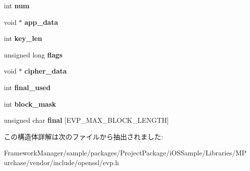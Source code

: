 \begin{DoxyCompactItemize}
\item 
\hypertarget{structevp__cipher__ctx__st_ae09b6c40179528583d8d7b3cc623bd87}{}int {\bfseries num}\label{structevp__cipher__ctx__st_ae09b6c40179528583d8d7b3cc623bd87}

\item 
\hypertarget{structevp__cipher__ctx__st_a00e9113f48a52bc9b1b95cc01a2560fa}{}void $\ast$ {\bfseries app\+\_\+data}\label{structevp__cipher__ctx__st_a00e9113f48a52bc9b1b95cc01a2560fa}

\item 
\hypertarget{structevp__cipher__ctx__st_a61064bef0c7565f3509f8d48f253637d}{}int {\bfseries key\+\_\+len}\label{structevp__cipher__ctx__st_a61064bef0c7565f3509f8d48f253637d}

\item 
\hypertarget{structevp__cipher__ctx__st_acc3a9b3a3e5a7ca498e3f5817ffc533f}{}unsigned long {\bfseries flags}\label{structevp__cipher__ctx__st_acc3a9b3a3e5a7ca498e3f5817ffc533f}

\item 
\hypertarget{structevp__cipher__ctx__st_a9f5ecc2a2fb070546367e44efc1d2ce8}{}void $\ast$ {\bfseries cipher\+\_\+data}\label{structevp__cipher__ctx__st_a9f5ecc2a2fb070546367e44efc1d2ce8}

\item 
\hypertarget{structevp__cipher__ctx__st_a3cc687900b93b8cc130b52b0d5d9a836}{}int {\bfseries final\+\_\+used}\label{structevp__cipher__ctx__st_a3cc687900b93b8cc130b52b0d5d9a836}

\item 
\hypertarget{structevp__cipher__ctx__st_aaa51b6dbde049f6b51227aab31a9c21d}{}int {\bfseries block\+\_\+mask}\label{structevp__cipher__ctx__st_aaa51b6dbde049f6b51227aab31a9c21d}

\item 
\hypertarget{structevp__cipher__ctx__st_afe49879d0b4707382a3477ebb4eda55b}{}unsigned char {\bfseries final} \mbox{[}E\+V\+P\+\_\+\+M\+A\+X\+\_\+\+B\+L\+O\+C\+K\+\_\+\+L\+E\+N\+G\+T\+H\mbox{]}\label{structevp__cipher__ctx__st_afe49879d0b4707382a3477ebb4eda55b}

\end{DoxyCompactItemize}


この構造体詳解は次のファイルから抽出されました\+:\begin{DoxyCompactItemize}
\item 
Framework\+Manager/sample/packages/\+Project\+Package/i\+O\+S\+Sample/\+Libraries/\+M\+Purchase/vendor/include/openssl/evp.\+h\end{DoxyCompactItemize}
